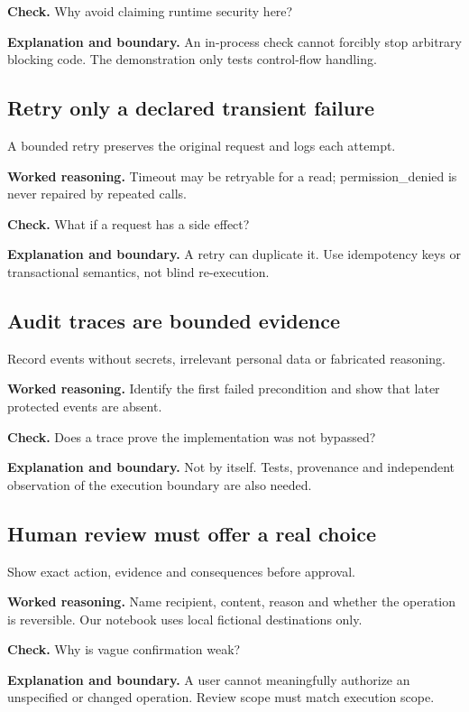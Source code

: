 \textbf{Check.} Why avoid claiming runtime security here?

\textbf{Explanation and boundary.} An in-process check cannot forcibly stop arbitrary blocking code. The demonstration only tests control-flow handling.

\subsection{Retry only a declared transient failure}
A bounded retry preserves the original request and logs each attempt.

\textbf{Worked reasoning.} Timeout may be retryable for a read; permission\_denied is never repaired by repeated calls.

\textbf{Check.} What if a request has a side effect?

\textbf{Explanation and boundary.} A retry can duplicate it. Use idempotency keys or transactional semantics, not blind re-execution.

\subsection{Audit traces are bounded evidence}
Record events without secrets, irrelevant personal data or fabricated reasoning.

\textbf{Worked reasoning.} Identify the first failed precondition and show that later protected events are absent.

\textbf{Check.} Does a trace prove the implementation was not bypassed?

\textbf{Explanation and boundary.} Not by itself. Tests, provenance and independent observation of the execution boundary are also needed.

\subsection{Human review must offer a real choice}
Show exact action, evidence and consequences before approval.

\textbf{Worked reasoning.} Name recipient, content, reason and whether the operation is reversible. Our notebook uses local fictional destinations only.

\textbf{Check.} Why is vague confirmation weak?

\textbf{Explanation and boundary.} A user cannot meaningfully authorize an unspecified or changed operation. Review scope must match execution scope.

